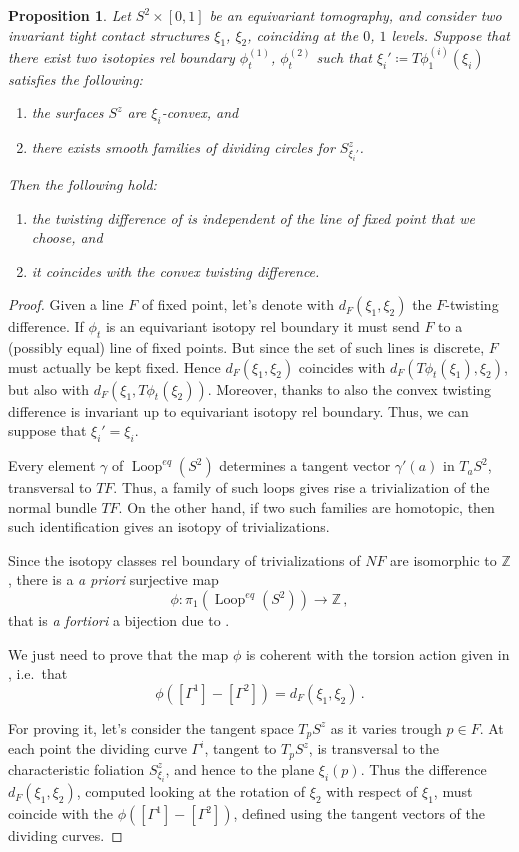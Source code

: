\documentclass[a4paper, 11pt]{amsart}
\theoremstyle{plain}
\newtheorem{prop}{Proposition}[section]
\theoremstyle{definition}
\newcommand{\Z}{\mathbb{Z}}
\DeclareMathOperator{\Loop}{Loop}
\begin{document}
\begin{prop}\label{twdefequal}
	Let $S^2 \times [0,1]$ be an equivariant tomography, and consider two invariant tight contact structures $\xi_1$, $\xi_2$, coinciding at the $0$, $1$ levels. Suppose that there exist two isotopies rel boundary $\phi_t^{(1)}$, $\phi_t^{(2)}$ such that $\xi_i' \coloneqq T\phi_1^{(i)}(\xi_i)$ satisfies the following:
	\begin{enumerate}
		\item the surfaces $S^z$ are $\xi_i$-convex, and
		\item there exists smooth families of dividing circles for $S^z_{\xi_i'}$.
	\end{enumerate}
	Then the following hold:
	\begin{enumerate}
		\item the twisting difference of  is independent of the line of fixed point that we choose, and
		\item it coincides with the convex twisting difference.
	\end{enumerate}
\end{prop}
\begin{proof}
	Given a line $F$ of fixed point, let's denote with $d_F(\xi_1, \xi_2)$ the $F$-twisting difference. If $\phi_t$ is an equivariant isotopy rel boundary it must send $F$ to a (possibly equal) line of fixed points. But since the set of such lines is discrete, $F$ must actually be kept fixed. Hence $d_F(\xi_1, \xi_2)$ coincides with $d_F(T\phi_t(\xi_1),\xi_2)$, but also with $d_F(\xi_1, T\phi_t(\xi_2))$. Moreover, thanks to  also the convex twisting difference is invariant up to equivariant isotopy rel boundary. Thus, we can suppose that $\xi_i' = \xi_i$.
	
	Every element $\gamma$ of $\Loop^{eq}(S^2)$ determines a tangent vector $\gamma'(a)$ in $T_aS^2$, transversal to $TF$. Thus, a family of such loops gives rise a trivialization of the normal bundle $TF$. On the other hand, if two such families are homotopic, then such identification gives an isotopy of trivializations.
	
	Since the isotopy classes rel boundary of trivializations of $NF$ are isomorphic to $\Z$, there is a \emph{a priori} surjective map 
	\[
		\phi \colon \pi_1(\Loop^{eq}(S^2)) \to \Z\,,
	\]
	that is \emph{a fortiori} a bijection due to .
	
	We just need to prove that the map $\phi$ is coherent with the torsion action given in , i.e.\ that 
	\[
		\phi([\Gamma^1]- [\Gamma^2]) = d_F(\xi_1, \xi_2)\,.
	\] 
	
	For proving it, let's consider the tangent space $T_pS^z$ as it varies trough $p \in F$. At each point the dividing curve $\Gamma^i$, tangent to $T_pS^z$, is transversal to the characteristic foliation $S^z_{\xi_i}$, and hence to the plane $\xi_i(p)$. Thus the difference $d_F(\xi_1,\xi_2)$, computed looking at the rotation of $\xi_2$ with respect of $\xi_1$, must coincide with the $\phi([\Gamma^1]- [\Gamma^2])$, defined using the tangent vectors of the dividing curves.
\end{proof}
\end{document}
